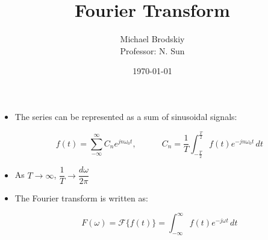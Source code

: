 


\title{Fourier Transform}
\date{\today}
\author{Michael Brodskiy\\ \small Professor: N. Sun}



\maketitle

\begin{itemize}

  \item The series can be represented as a sum of sinusoidal signals:

    $$f(t)=\sum_{-\infty}^{\infty} C_ne^{jn\omega_0t},\quad\quad\quad C_n=\frac{1}{T}\int_{-\frac{T}{2}}^{\frac{T}{2}} f(t)e^{-jn\omega_0 t}\,dt$$

  \item As $T\to\infty$, $\dfrac{1}{T}\to\dfrac{d\omega}{2\pi}$

  \item The Fourier transform is written as:

    $$F(\omega)=\mathcal{F}\{f(t)\}=\int_{-\infty}^{\infty}f(t)e^{-j\omega t}\,dt$$

\end{itemize}



